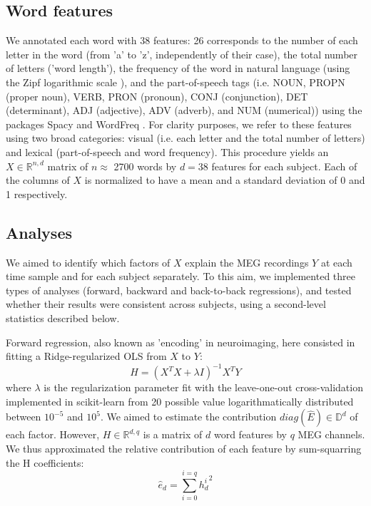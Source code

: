 \subsection{Word features} We annotated each word with 38 features: 26
corresponds to the number of each letter in the word (from 'a' to 'z',
independently of their case), the total number of letters ('word length'), the
frequency of the word in natural language (using the Zipf logarithmic scale
\cite{marc_brysbaert}), and the part-of-speech tags (i.e. NOUN, PROPN (proper
noun), VERB, PRON (pronoun), CONJ (conjunction), DET (determinant), ADJ
(adjective), ADV (adverb), and NUM (numerical)) using the packages Spacy
\cite{spacy} and WordFreq \cite{speer}. For clarity purposes, we refer to these
features using two broad categories: visual (i.e. each letter and the total
number of letters) and lexical (part-of-speech and word frequency).  This
procedure yields an $X \in \mathbb{R}^{n, d}$ matrix of $n\approx$ 2700 words by
$d=38$ features for each subject. Each of the columns of $X$ is normalized to
have a mean and a standard deviation of 0 and 1 respectively.

\subsection{Analyses} We aimed to identify which factors of $X$ explain the MEG
recordings $Y$ at each time sample and for each subject separately. To this aim,
we implemented three types of analyses (forward, backward and back-to-back
regressions), and tested whether their results were consistent across subjects,
using a second-level statistics described below.

Forward regression, also known as 'encoding' in neuroimaging, here consisted in
fitting a Ridge-regularized OLS from $X$ to $Y$: \begin{equation} H =
(X^{T}X+\lambda I)^{-1} X^{T}Y \end{equation} where $\lambda$ is the
regularization parameter fit with the leave-one-out cross-validation implemented
in scikit-learn \cite{sklearn} from 20 possible value logarithmatically
distributed between $10^{-5}$ and $10^5$. We aimed to estimate the contribution
$diag(\hat E) \in\mathbb{D}^{d} $ of each factor. However, $H\in\mathbb{R}^{d,
q}$ is a matrix of $d$ word features by $q$ MEG channels. We thus approximated
the relative contribution of each feature by sum-squarring the H coefficients:
\begin{equation} \hat e_d = \sum_{i=0}^{i=q} {h_d^i}^2 \end{equation}


